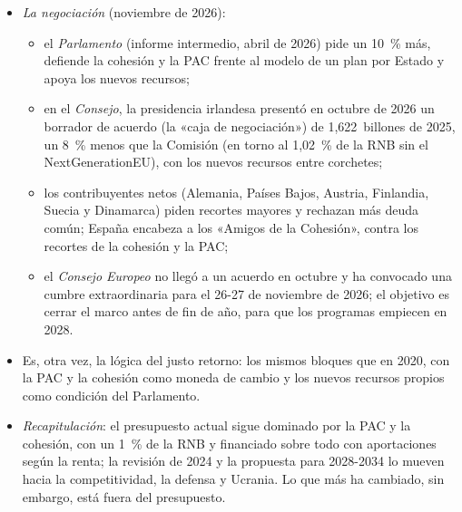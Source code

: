 \documentclass[11pt]{article}
\begin{document}
\begin{itemize}
\begin{itemize}
  \end{itemize}
\item \emph{La negociación} (noviembre de 2026):
  \begin{itemize}
  \item el \emph{Parlamento} (informe intermedio, abril de 2026) pide un 10~\% más, defiende la cohesión y la PAC frente al modelo de un plan por Estado y apoya los nuevos recursos\nocite{PE2026InformeIntermedio};
  \item en el \emph{Consejo}, la presidencia irlandesa presentó en octubre de 2026 un borrador de acuerdo (la «caja de negociación») de 1,622~billones de 2025, un 8~\% menos que la Comisión (en torno al 1,02~\% de la RNB sin el NextGenerationEU), con los nuevos recursos entre corchetes;
  \item los contribuyentes netos (Alemania, Países Bajos, Austria, Finlandia, Suecia y Dinamarca) piden recortes mayores y rechazan más deuda común; España encabeza a los «Amigos de la Cohesión», contra los recortes de la cohesión y la PAC\nocite{EPRS2026MFP};
  \item el \emph{Consejo Europeo} no llegó a un acuerdo en octubre y ha convocado una cumbre extraordinaria para el 26-27 de noviembre de 2026; el objetivo es cerrar el marco antes de fin de año, para que los programas empiecen en 2028.
  \end{itemize}
\item Es, otra vez, la lógica del justo retorno: los mismos bloques que en 2020, con la PAC y la cohesión como moneda de cambio y los nuevos recursos propios como condición del Parlamento.
\end{itemize}

\begin{infografia}[H]
\centering
\caption{La propuesta de MFP 2028-2034 frente al marco actual}\label{figu:mfp-2028}
\end{infografia}

\begin{itemize}
\item \emph{Recapitulación}: el presupuesto actual sigue dominado por la PAC y la cohesión, con un 1~\% de la RNB y financiado sobre todo con aportaciones según la renta; la revisión de 2024 y la propuesta para 2028-2034 lo mueven hacia la competitividad, la defensa y Ucrania. Lo que más ha cambiado, sin embargo, está fuera del presupuesto.
\end{itemize}
\end{document}
